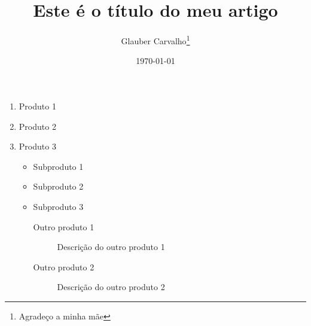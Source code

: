 \documentclass[12pt, a4paper]{article}	%
\title{Este é o título do meu artigo}	%
\author{Glauber Carvalho\thanks{Agradeço a minha mãe}}	%
\date{\today}	%
\begin{document}
	\begin{enumerate}
		\item Produto 1
		\item Produto 2
		\item Produto 3
			\begin{itemize}
				\item Subproduto 1
				\item Subproduto 2
				\item Subproduto 3
				\begin{description}
					\item[Outro produto 1]{Descrição do outro produto 1 }
					\item[Outro produto 2]{Descrição do outro produto 2 }
				\end{description}
			\end{itemize}
			
	\end{enumerate}
		
\end{document}
